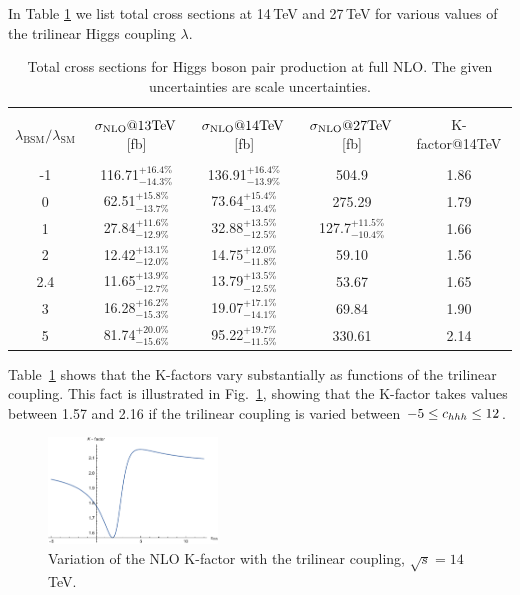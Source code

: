 In Table \ref{tab:sigmatot} we list total cross sections at 14\,TeV and 27\,TeV for various values of the trilinear Higgs coupling $\lambda$. 
\begin{table}[htb]
\begin{center}
\begin{tabular}{| c | c | c |c|c|}
\hline
&&&&\\
$\lambda_{\mathrm{BSM}}/\lambda_{\mathrm{SM}}$ & $\sigma_{\rm{NLO}}@13 \mathrm{TeV}$\,[fb]& $\sigma_{\rm{NLO}}@14 \mathrm{TeV}$\,[fb] & $\sigma_{\rm{NLO}}@27 \mathrm{TeV}$\,[fb] &K-factor@14TeV\\
&&&&\\
\hline
-1& 116.71$^{+16.4\%}_{-14.3\%}$  & 136.91$^{+16.4\%}_{-13.9\%}$& 504.9 & 1.86 \\
\hline
0& 62.51$^{+15.8\%}_{-13.7\%}$ & 73.64$^{+15.4\%}_{-13.4\%}$& 275.29& 1.79  \\
\hline 
1& 27.84$^{+11.6\%}_{-12.9\%}$ & 32.88$^{+13.5\%}_{-12.5\%}$&127.7$^{+11.5\%}_{-10.4\%}$ &1.66\\
\hline
2 & 12.42$^{+13.1\%}_{-12.0\%}$ & 14.75$^{+12.0\%}_{-11.8\%}$ &  59.10 & 1.56 \\
\hline
2.4& 11.65$^{+13.9\%}_{-12.7\%}$ & 13.79$^{+13.5\%}_{-12.5\%}$& 53.67 & 1.65 \\
\hline
3& 16.28$^{+16.2\%}_{-15.3\%}$ & 19.07$^{+17.1\%}_{-14.1\%}$ & 69.84 & 1.90 \\
\hline 
5& 81.74$^{+20.0\%}_{-15.6\%}$  & 95.22$^{+19.7\%}_{-11.5\%}$& 330.61 & 2.14 \\
\hline 
\end{tabular}
\end{center}
\caption{Total cross sections for Higgs boson pair production at full NLO. The given uncertainties are scale uncertainties. 
\label{tab:sigmatot}}
\end{table}
Table~\ref{tab:sigmatot} shows that the K-factors vary substantially as functions of the trilinear coupling.
This fact is illustrated in Fig.~\ref{fig:Kfacvariation}, showing that the K-factor takes values between 1.57 and 2.16
if the trilinear coupling is varied between $-5\leq c_{hhh}\leq 12$.

\begin{figure}[htb]
  \centering
    \includegraphics[width=0.4\textwidth]{plots/Kfac_varlambda.pdf}
\caption{Variation of the NLO K-factor with the trilinear coupling, $\sqrt{s}=14$\,TeV.}
\label{fig:Kfacvariation}
\end{figure}



